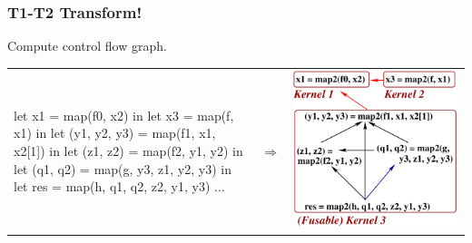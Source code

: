 \documentclass{beamer}
\begin{document}
\begin{frame}[fragile,t]
  \frametitle{T1-T2 Transform!}

Compute control flow graph.

\begin{tabular}{p{4.5cm}cp{4cm}}
\begin{minipage}{4cm}
\begin{colorcode}
let x1 = map(f0, x2) in
let x3 = map(f, x1) in
let (y1, y2, y3) =
  map(f1, x1, x2[1]) in
let (z1, z2) =
  map(f2, y1, y2) in
let (q1, q2) =
  map(g, y3, z1, y2, y3) in
let res =
  map(h, q1, q2, z2, y1, y3) ...
\end{colorcode}
\end{minipage}
&
$\Rightarrow$
&
\begin{minipage}{4cm}
\includegraphics[height=30ex]{Figures/T1T2}
\end{minipage}
\end{tabular}
\end{frame}

\end{document}

